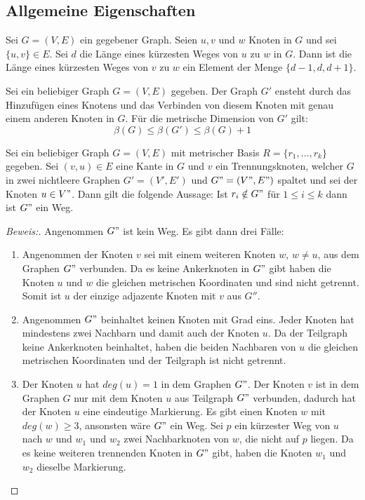 \subsection{Allgemeine Eigenschaften}
\begin{lem}\cite{landmarks}
\label{dist}
Sei $G=(V,E)$ ein gegebener Graph. Seien $u,v$ und $w$ Knoten in $G$ und sei $\{u,v\}\in E$. Sei $d$ die Länge eines kürzesten Weges von $u$ zu $w$ in $G$. Dann ist die Länge eines kürzesten Weges von $v$ zu $w$ ein Element der Menge $\{d-1,d,d+1\}$.
\end{lem}
\begin{lem}
\cite{bases}
\label{einelementreichtnicht}
Sei ein beliebiger Graph $G=(V,E)$ gegeben. Der Graph $G'$ ensteht durch das Hinzufügen eines Knotens und das Verbinden von diesem Knoten mit genau einem anderen Knoten in $G$. Für die metrische Dimension von $G'$ gilt:
$$\beta(G)\leq \beta(G')\leq \beta(G)+1$$ 
\end{lem}
\begin{lem}
\label{wegtrennungsknoten}
\label{first_theorem}
Sei ein beliebiger Graph $G=(V,E)$ mit metrischer Basis $R=\{r_1, \ldots, r_k\}$ gegeben. Sei $(v,u) \in E$ eine Kante in $G$ und $v$ ein Trennungsknoten, welcher $G$ in zwei nichtleere Graphen $G'=(V',E')$ und $G"=(V",E")$ spaltet und sei der Knoten $u \in V"$. Dann gilt die folgende Aussage:\newline
Ist $r_i \notin G"$ für $1 \leq i \leq k$ dann ist $G"$ ein Weg.
\end{lem}
\begin{proof}[Beweis:]
Angenommen $G"$ ist kein Weg. Es gibt dann drei Fälle:
\begin{enumerate}
\item Angenommen der Knoten $v$ sei mit einem weiteren Knoten $w$, $w \neq u$, aus dem Graphen $G"$ verbunden. Da es keine Ankerknoten in $G"$ gibt haben die Knoten $u$ und $w$ die gleichen metrischen Koordinaten und sind nicht getrennt. Somit ist $u$ der einzige adjazente Knoten mit $v$ aus $G''$.
\item Angenommen $G"$ beinhaltet keinen Knoten mit Grad eins. Jeder Knoten hat mindestens zwei Nachbarn und damit auch der Knoten $u$. Da der Teilgraph keine Ankerknoten beinhaltet, haben die beiden Nachbaren von $u$ die gleichen metrischen Koordinaten und der Teilgraph ist nicht getrennt.
\item Der Knoten $u$ hat $deg(u)=1$ in dem Graphen $G"$. Der Knoten $v$ ist in dem Graphen $G$ nur mit dem Knoten $u$ aus Teilgraph $G"$ verbunden, dadurch hat der Knoten $u$ eine eindeutige Markierung. Es gibt einen Knoten $w$ mit $deg(w) \geq 3$, ansonsten wäre $G"$ ein Weg. Sei $p$ ein kürzester Weg von $u$ nach $w$ und $w_1$ und $w_2$ zwei Nachbarknoten von $w$, die nicht auf $p$ liegen. Da es keine weiteren trennenden Knoten in $G"$ gibt, haben die Knoten $w_1$ und $w_2$ dieselbe Markierung.   
\end{enumerate}
\vspace{-4mm}
\end{proof}
